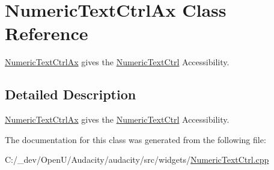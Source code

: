 \hypertarget{class_numeric_text_ctrl_ax}{}\section{Numeric\+Text\+Ctrl\+Ax Class Reference}
\label{class_numeric_text_ctrl_ax}


\hyperlink{class_numeric_text_ctrl_ax}{Numeric\+Text\+Ctrl\+Ax} gives the \hyperlink{class_numeric_text_ctrl}{Numeric\+Text\+Ctrl} Accessibility.  




\subsection{Detailed Description}
\hyperlink{class_numeric_text_ctrl_ax}{Numeric\+Text\+Ctrl\+Ax} gives the \hyperlink{class_numeric_text_ctrl}{Numeric\+Text\+Ctrl} Accessibility. 

The documentation for this class was generated from the following file\+:\begin{DoxyCompactItemize}
\item 
C\+:/\+\_\+dev/\+Open\+U/\+Audacity/audacity/src/widgets/\hyperlink{_numeric_text_ctrl_8cpp}{Numeric\+Text\+Ctrl.\+cpp}\end{DoxyCompactItemize}
